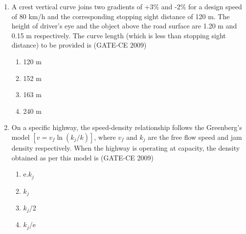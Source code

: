 \documentclass[journal,12pt,onecolumn]{article}
\theoremstyle{remark}
\begin{document}
\begin{enumerate}
    \item A crest vertical curve joins two gradients of +3\% and -2\% for a design speed of 80 km/h and the corresponding stopping sight distance of 120 m. The height of driver's eye and the object above the road surface are 1.20 m and 0.15 m respectively. The curve length (which is less than stopping sight distance) to be provided is (GATE-CE 2009)
    \begin{multicols}{4}
    \begin{enumerate}
        \item 120 m 
        \item 152 m 
        \item 163 m 
        \item 240 m
    \end{enumerate}
\end{multicols}
    
    \item On a specific highway, the speed-density relationship follows the Greenberg's model $[v = v_f \ln(k_j / k)]$, where $v_f$ and $k_j$ are the free flow speed and jam density respectively. When the highway is operating at capacity, the density obtained as per this model is (GATE-CE 2009)
    \begin{multicols}{2}
    \begin{enumerate}
        \item e.$k_j$ 
        \item $k_j$ 
        \item $k_j$/2 
        \item $k_j$/e
    \end{enumerate}
\end{multicols}
    

\end{enumerate}
\end{document}
